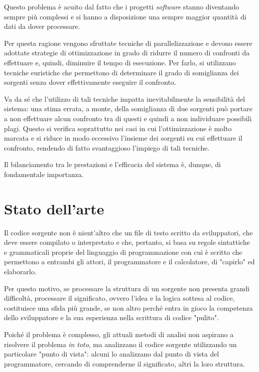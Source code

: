 Questo problema è acuito dal fatto che i progetti \textit{software} stanno diventando sempre più complessi e si hanno a disposizione una sempre maggior quantità di dati da dover processare.

Per questa ragione vengono sfruttate tecniche di parallelizzazione e devono essere adottate strategie di ottimizzazione in grado di ridurre il numero di confronti da effettuare e, quindi, diminuire il tempo di esecuzione.
%
Per farlo, si utilizzano tecniche euristiche che permettono di determinare il grado di somiglianza dei sorgenti senza dover effettivamente eseguire il confronto.

Va da sé che l'utilizzo di tali tecniche impatta inevitabilmente la sensibilità del sistema: una stima errata, a monte, della somiglianza di due sorgenti può portare a non effettuare alcun confronto tra di questi e quindi a non individuare possibili plagi. 
%
Questo si verifica soprattutto nei casi in cui l'ottimizzazione è molto marcata e si riduce in modo eccessivo l'insieme dei sorgenti su cui effettuare il confronto, rendendo di fatto svantaggioso l'impiego di tali tecniche.

Il bilanciamento tra le prestazioni e l'efficacia del sistema è, dunque, di fondamentale importanza.


\section{Stato dell'arte}

Il codice sorgente non è nient'altro che un file di testo scritto da sviluppatori, che deve essere compilato o interpretato e che, pertanto, si basa su regole sintattiche e grammaticali proprie del linguaggio di programmazione con cui è scritto che permettono a entrambi gli attori, il programmatore e il calcolatore, di "capirlo" ed elaborarlo.

Per questo motivo, se processare la struttura di un sorgente non presenta grandi difficoltà, processare il significato, ovvero l'idea e la logica sottesa al codice, costituisce una sfida più grande, se non altro perché entra in gioco la competenza dello sviluppatore e la sua esperienza nella scrittura di codice "pulito".

Poiché il problema è complesso, gli attuali metodi di analisi non aspirano a risolvere il problema \textit{in toto}, ma analizzano il codice sorgente utilizzando un particolare "punto di vista": alcuni lo analizzano dal punto di vista del programmatore, cercando di comprenderne il significato, altri la loro struttura.

